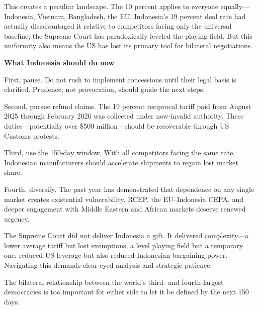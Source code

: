 \documentclass[12pt,a4paper]{article}
\begin{document}
This creates a peculiar landscape. The 10 percent applies to everyone equally---Indonesia, Vietnam, Bangladesh, the EU. Indonesia's 19 percent deal rate had actually disadvantaged it relative to competitors facing only the universal baseline; the Supreme Court has paradoxically leveled the playing field. But this uniformity also means the US has lost its primary tool for bilateral negotiations.

\bigskip
\noindent\textbf{What Indonesia should do now}

\medskip
First, pause. Do not rush to implement concessions until their legal basis is clarified. Prudence, not provocation, should guide the next steps.

Second, pursue refund claims. The 19 percent reciprocal tariff paid from August 2025 through February 2026 was collected under now-invalid authority. These duties---potentially over \$500 million---should be recoverable through US Customs protests.

Third, use the 150-day window. With all competitors facing the same rate, Indonesian manufacturers should accelerate shipments to regain lost market share.

Fourth, diversify. The past year has demonstrated that dependence on any single market creates existential vulnerability. RCEP, the EU--Indonesia CEPA, and deeper engagement with Middle Eastern and African markets deserve renewed urgency.

The Supreme Court did not deliver Indonesia a gift. It delivered complexity---a lower average tariff but lost exemptions, a level playing field but a temporary one, reduced US leverage but also reduced Indonesian bargaining power. Navigating this demands clear-eyed analysis and strategic patience.

The bilateral relationship between the world's third- and fourth-largest democracies is too important for either side to let it be defined by the next 150 days.
\end{document}
